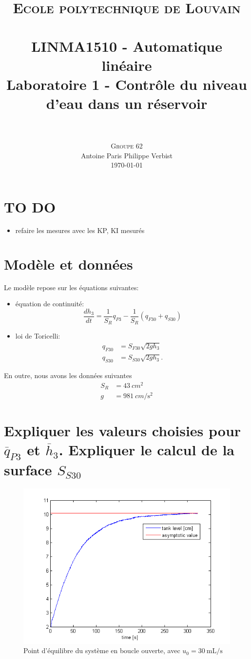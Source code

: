 \documentclass[frenchb, paper=a4, fontsize=11pt]{scrartcl}
\title{
		\usefont{OT1}{bch}{b}{n}
		\normalfont \normalsize \textsc{Ecole polytechnique de Louvain} \\ [25pt]
		\horrule{0.5pt} \\[0.4cm]
		\large LINMA1510 - Automatique linéaire\\
		\huge Laboratoire 1 - Contrôle du niveau d'eau dans un réservoir \\
		\horrule{1.5pt} \\[0.5cm]
}
\author{
		\normalfont
		\textsc{Groupe 62}\\
      	Antoine Paris\hspace{0.6cm} Philippe Verbist \\	
       	\normalsize
        \today
}
\date{}
\newcommand*\eq[1]{\overline{#1}} 				%
\numberwithin{equation}{section}					%
\numberwithin{figure}{section}					%
\numberwithin{table}{section}						%
\begin{document}
\maketitle

\section*{TO DO}

\begin{itemize}
\item refaire les mesures avec les KP, KI mesurés
\end{itemize}


\section{Modèle et données}

Le modèle repose sur les équations suivantes:
\begin{itemize}
\item équation de continuité:
\begin{equation}
\frac{dh_3}{dt} = \frac{1}{S_R}q_{P3} - \frac{1}{S_R}(q_{F30}+q_{S30})
\label{eq:contnuity}
\end{equation}
\item loi de Toricelli:
\begin{align}
q_{F30}& = S_{F30} \sqrt{2gh_3} \label{eq:toricelliF}\\
q_{S30} &= S_{S30} \sqrt{2gh_3} \label{eq:toricelliS}.
\end{align}
\end{itemize}

En outre, nous avons les données suivantes
\begin{align}
S_R& = \SI{43}{cm^2}\\
g &= \SI{981}{cm\per\second^2}
\end{align}

\section{Expliquer les valeurs choisies pour $\eq{q}_{P3}$ et $\eq{h}_3$. Expliquer le calcul de la surface $S_{S30}$}

\begin{figure}[!ht]
	\centering
	\includegraphics[width=0.6\linewidth]{img/exp1_ol.png}
	\caption{Point d'équilibre du système en boucle ouverte, avec $u_0 = \SI{30}{\milli\liter\per\second}$}
	\label{fig:exp1_ol}
\end{figure}
\end{document}
